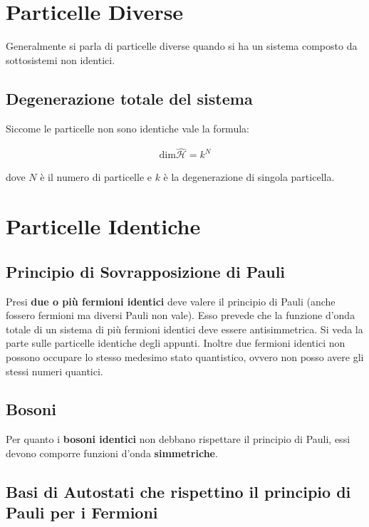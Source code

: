 
\section{Particelle Diverse}

	Generalmente si parla di particelle diverse quando si ha un sistema composto da sottosistemi non identici.
	
\subsection{Degenerazione totale del sistema}

	Siccome le particelle non sono identiche vale la formula:
	
\begin{align*}
	\text{dim}\hat{\mathcal{H}} = k^N
\end{align*}

	dove $N$ è il numero di particelle e $k$ è la degenerazione di singola particella. 



\section{Particelle Identiche}

\subsection{Principio di Sovrapposizione di Pauli}
	
	Presi \textbf{due o più fermioni identici} deve valere il principio di Pauli (anche fossero fermioni ma diversi Pauli non vale). Esso prevede che la funzione d'onda totale di un sistema di più fermioni identici deve essere antisimmetrica. Si veda la parte sulle particelle identiche degli appunti. Inoltre due fermioni identici non possono occupare lo stesso medesimo stato quantistico, ovvero non posso avere gli stessi numeri quantici.
	
\subsection{Bosoni}

	Per quanto i \textbf{bosoni identici} non debbano rispettare il principio di Pauli, essi devono comporre funzioni d'onda \textbf{simmetriche}.

\subsection{Basi di Autostati che rispettino il principio di Pauli per i Fermioni}

